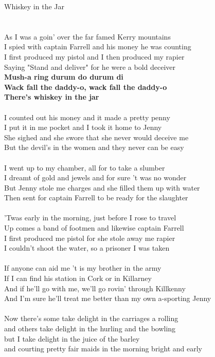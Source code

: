 \documentclass[letterpaper,9pt]{article}
\begin{document}
\newpage
{}
\huge
Whiskey in the Jar\\
\\
\Large
\noindent
\\As I was a goin' over the far famed Kerry mountains
\\I spied with captain Farrell and his money he was counting
\\I first produced my pistol and I then produced my rapier
\\Saying "Stand and deliver" for he were a bold deceiver
\\\textbf{Mush-a ring durum do durum di
\\Wack fall the daddy-o, wack fall the daddy-o
\\There's whiskey in the jar}
\\
\\I counted out his money and it made a pretty penny
\\I put it in me pocket and I took it home to Jenny
\\She sighed and she swore that she never would deceive me
\\But the devil's in the women and they never can be easy
\\
\\I went up to my chamber, all for to take a slumber
\\I dreamt of gold and jewels and for sure 't was no wonder
\\But Jenny stole me charges and she filled them up with water
\\Then sent for captain Farrell to be ready for the slaughter
\\
\\'Twas early in the morning, just before I rose to travel
\\Up comes a band of footmen and likewise captain Farrell
\\I first produced me pistol for she stole away me rapier
\\I couldn't shoot the water, so a prisoner I was taken
\\
\\If anyone can aid me 't is my brother in the army
\\If I can find his station in Cork or in Killarney
\\And if he'll go with me, we'll go rovin' through Killkenny
\\And I'm sure he'll treat me better than my own a-sporting Jenny
\\
\\Now there's some take delight in the carriages a rolling
\\and others take delight in the hurling and the bowling
\\but I take delight in the juice of the barley
\\and courting pretty fair maids in the morning bright and early
\end{document}
